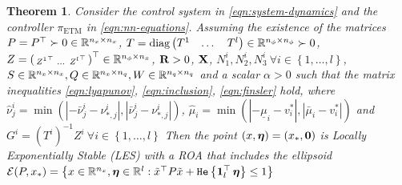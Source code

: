\documentclass{ifacconf}
\theoremstyle{plain}
\newtheorem{theorem}{Theorem}
\begin{document}

\begin{theorem}\label{thm:stability} \emph{ Consider the control system in \eqref{eqn:system-dynamics} and the controller $\pi_{\text{ETM}}$ in \eqref{eqn:nn-equations}. Assuming the existence of the matrices $P = P^\top \succ 0 \in {\mathbb{R}}^{n_x \times n_x}$,} $T = \text{diag} \left(\begin{matrix}T^1 & \dots & T^l\end{matrix}\right) \in {\mathbb{R}}^{n_{\phi} \times n_{\phi}} \succ 0$, \emph{$Z = \left(\begin{smallmatrix} {Z^1}^\top & \dots & {Z^l}^\top \end{smallmatrix} \right)^\top \in {\mathbb{R}}^{n_{\phi} \times n_x}$, ${\bf{R}} > 0$, ${\bf{X}}$, $N^i_1, N^i_2, N^i_3 \ \forall i \in \left\{ 1, \dots, l \right\}$, $S \in {\mathbb{R}}^{n_x \times n_x}, Q \in {\mathbb{R}}^{n_x \times n_q}, W \in {\mathbb{R}}^{n_q \times n_q}$ and a scalar $\alpha > 0$ such that the matrix inequalities \eqref{eqn:lyapunov}, \eqref{eqn:inclusion}, \eqref{eqn:finsler} hold, where $\widehat{\nu}_j^i = \min(|-\bar{\nu}_j^i - \nu^i_{*, j}|,|\bar{\nu}_j^i - \nu^i_{*, j}|)$, $
\widehat{\mu}_i = \min(|-\underline{\mu}_i - v_i^*|,|\bar{\mu}_i - v_i^*|)$ and $G^i = (T^i)^{-1} Z^i\ \forall i \in \left\{1, \dots, l \right\}$
Then the point $(x, \boldsymbol{\eta}) = (x_*, \operatorname{\mathbf{0}})$ is Locally Exponentially Stable (LES) with a ROA that includes the ellipsoid ${\mathcal{E}}(P, x_*) = \left\{ x \in {\mathbb{R}}^{n_x}, \boldsymbol{\eta} \in {\mathbb{R}}^{l} : \tilde{x}^\top P \tilde{x} + \texttt{\relax{He}}\left\{{\operatorname{\mathbf{1}}_l^\top \boldsymbol{\eta}}\right\} \leq 1\right\}$}
\end{theorem}
\end{document}
